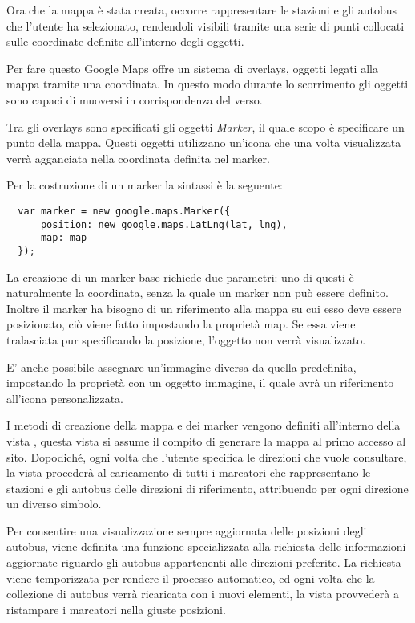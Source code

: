 Ora che la mappa è stata creata, occorre rappresentare le stazioni e gli autobus che l'utente ha selezionato, rendendoli visibili tramite una serie di punti collocati sulle coordinate definite all'interno degli oggetti.

Per fare questo Google Maps offre un sistema di overlays, oggetti legati alla mappa tramite una coordinata. In questo modo durante lo scorrimento gli oggetti sono capaci di muoversi in corrispondenza del verso.

Tra gli overlays sono specificati gli oggetti {\itshape Marker}, il quale scopo è specificare un punto della mappa. Questi oggetti utilizzano un'icona che una volta visualizzata verrà agganciata nella coordinata definita nel marker.

Per la costruzione di un marker la sintassi è la seguente:

\begin{lstlisting}
  var marker = new google.maps.Marker({
      position: new google.maps.LatLng(lat, lng),
      map: map
  });
\end{lstlisting}

La creazione di un marker base richiede due parametri: uno di questi è naturalmente la coordinata, senza la quale un marker non può essere definito. Inoltre il marker ha bisogno di un riferimento alla mappa su cui esso deve essere posizionato, ciò viene fatto impostando la proprietà map. Se essa viene tralasciata pur specificando la posizione, l'oggetto non verrà visualizzato.

E' anche possibile assegnare un'immagine diversa da quella predefinita, impostando la proprietà  con un oggetto immagine, il quale avrà un riferimento all'icona personalizzata.
\vspace{0.5cm}

I metodi di creazione della mappa e dei marker vengono definiti all'interno della vista , questa vista si assume il compito di generare la mappa al primo accesso al sito. Dopodiché, ogni volta che l'utente specifica le direzioni che vuole consultare, la vista procederà al caricamento di tutti i marcatori che rappresentano le stazioni e gli autobus delle direzioni di riferimento, attribuendo per ogni direzione un diverso simbolo.

Per consentire una visualizzazione sempre aggiornata delle posizioni degli autobus, viene definita una funzione specializzata alla richiesta delle informazioni aggiornate riguardo gli autobus appartenenti alle direzioni preferite. La richiesta viene temporizzata per rendere il processo automatico, ed ogni volta che la collezione di autobus verrà ricaricata con i nuovi elementi, la vista provvederà a ristampare i marcatori nella giuste posizioni.

